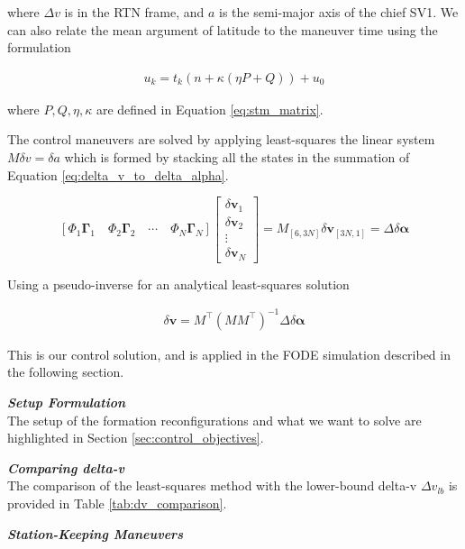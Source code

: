 where $\Delta v$ is in the RTN frame, and $a$ is the semi-major axis of the chief SV1. We can also relate the mean argument of latitude to the maneuver time using the formulation

\begin{align}
    u_k = t_{k} \left( n + \kappa \left( \eta P + Q \right) \right) + u_{0}
\end{align}

where $P, Q, \eta, \kappa$ are defined in Equation \ref{eq:stm_matrix}.

The control maneuvers are solved by applying least-squares the linear system $M\delta v = \delta a$ which is formed by stacking all the states in the summation of Equation \ref{eq:delta_v_to_delta_alpha}.

\begin{equation}
\left[
\Phi_1 \mathbf{\Gamma}_1 \quad
\Phi_2 \mathbf{\Gamma}_2 \quad
\cdots \quad
\Phi_N \mathbf{\Gamma}_N
\right]
\begin{bmatrix}
\delta \mathbf{v}_1 \\
\delta \mathbf{v}_2 \\
\vdots \\
\delta \mathbf{v}_N
\end{bmatrix}
= M_{[6,3N]} \delta \mathbf{v}_{[3N,1]} = \Delta \delta \boldsymbol{\alpha}
\end{equation}

Using a pseudo-inverse for an analytical least-squares solution 

\begin{align}
    \delta \mathbf{v} = M^\top (M M^\top)^{-1} \Delta \delta \boldsymbol{\alpha}
\end{align}

This is our control solution, and is applied in the FODE simulation described in the following section.

\textbf{\textit{Setup Formulation}} \\
The setup of the formation reconfigurations and what we want to solve are highlighted in Section \ref{sec:control_objectives}.

\textbf{\textit{Comparing delta-v}} \\
The comparison of the least-squares method with the lower-bound delta-v $\Delta v_{lb}$ is provided in Table \ref{tab:dv_comparison}.

\textbf{\textit{Station-Keeping Maneuvers}}

